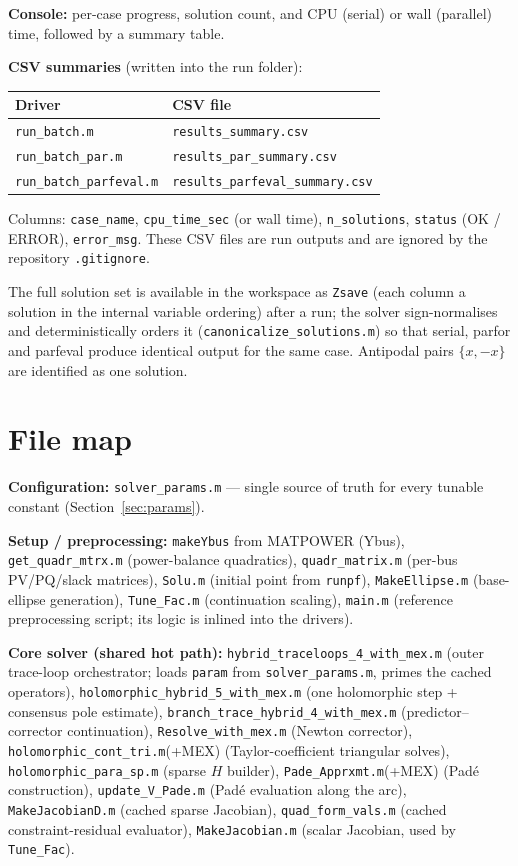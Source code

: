 \documentclass[11pt,a4paper]{article}
\newcommand{\code}[1]{\texttt{#1}}
\begin{document}
\textbf{Console:} per-case progress, solution count, and CPU (serial) or wall (parallel)
time, followed by a summary table.

\textbf{CSV summaries} (written into the run folder):
\begin{center}\small
\begin{tabular}{@{}ll@{}}
\toprule
Driver & CSV file\\
\midrule
\code{run_batch.m}          & \code{results_summary.csv}\\
\code{run_batch_par.m}      & \code{results_par_summary.csv}\\
\code{run_batch_parfeval.m} & \code{results_parfeval_summary.csv}\\
\bottomrule
\end{tabular}
\end{center}
Columns: \code{case_name}, \code{cpu_time_sec} (or wall time), \code{n_solutions},
\code{status} (OK / ERROR), \code{error_msg}.
These CSV files are run outputs and are ignored by the repository \code{.gitignore}.

The full solution set is available in the workspace as \code{Zsave} (each column a
solution in the internal variable ordering) after a run; the solver sign-normalises and
deterministically orders it (\code{canonicalize_solutions.m}) so that serial, parfor and
parfeval produce identical output for the same case. Antipodal pairs $\{x,-x\}$ are
identified as one solution.

\section{File map}

\textbf{Configuration:} \code{solver_params.m} --- single source of truth for every
tunable constant (Section~\ref{sec:params}).

\textbf{Setup / preprocessing:}
\code{makeYbus} from MATPOWER (Ybus), \code{get_quadr_mtrx.m} (power-balance quadratics),
\code{quadr_matrix.m} (per-bus PV/PQ/slack matrices), \code{Solu.m} (initial point from
\code{runpf}), \code{MakeEllipse.m} (base-ellipse generation), \code{Tune_Fac.m}
(continuation scaling), \code{main.m} (reference preprocessing script; its logic is
inlined into the drivers).

\textbf{Core solver (shared hot path):}
\code{hybrid_traceloops_4_with_mex.m} (outer trace-loop orchestrator; loads \code{param}
from \code{solver_params.m}, primes the cached operators), \code{holomorphic_hybrid_5_with_mex.m} (one
holomorphic step + consensus pole estimate), \code{branch_trace_hybrid_4_with_mex.m}
(predictor--corrector continuation), \code{Resolve_with_mex.m} (Newton corrector),
\code{holomorphic_cont_tri.m}(+MEX) (Taylor-coefficient triangular solves),
\code{holomorphic_para_sp.m} (sparse $H$ builder), \code{Pade_Apprxmt.m}(+MEX) (Pad\'e
construction), \code{update_V_Pade.m} (Pad\'e evaluation along the arc),
\code{MakeJacobianD.m} (cached sparse Jacobian), \code{quad_form_vals.m} (cached
constraint-residual evaluator), \code{MakeJacobian.m} (scalar Jacobian, used by
\code{Tune_Fac}).
\end{document}
